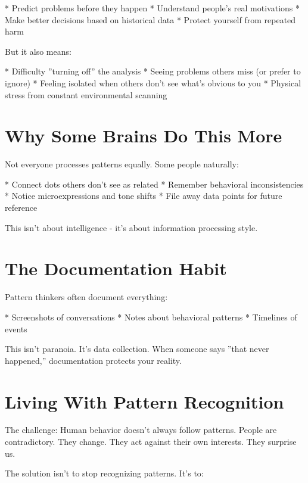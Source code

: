 \documentclass[12pt,oneside]{book}
\begin{document}
                    * Predict problems before they happen
                    * Understand people's real motivations
                    * Make better decisions based on historical data
                    * Protect yourself from repeated harm

But it also means:

                    * Difficulty ''turning off'' the analysis
                    * Seeing problems others miss (or prefer to ignore)
                    * Feeling isolated when others don't see what's obvious to you
                    * Physical stress from constant environmental scanning

\section{Why Some Brains Do This More}

Not everyone processes patterns equally. Some people naturally:

                    * Connect dots others don't see as related
                    * Remember behavioral inconsistencies
                    * Notice microexpressions and tone shifts
                    * File away data points for future reference

This isn't about intelligence - it's about information processing style.

\section{The Documentation Habit}

Pattern thinkers often document everything:

                    * Screenshots of conversations
                    * Notes about behavioral patterns
                    * Timelines of events

This isn't paranoia. It's data collection. When someone says ''that never happened,'' documentation protects your reality.

\section{Living With Pattern Recognition}

The challenge: Human behavior doesn't always follow patterns. People are contradictory. They change. They act against their own interests. They surprise us.

The solution isn't to stop recognizing patterns. It's to:
\end{document}
